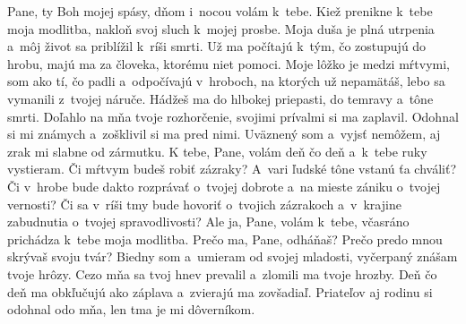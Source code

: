 Pane, ty Boh mojej spásy,
dňom i~nocou volám k~tebe.
\versseparator
Kiež prenikne k~tebe moja modlitba,
nakloň svoj sluch k~mojej prosbe.
\versseparator
Moja duša je plná utrpenia
a~môj život sa priblížil k~ríši smrti.
\versseparator
Už ma počítajú k~tým, čo zostupujú do hrobu,
majú ma za človeka, ktorému niet pomoci.
\versseparator
Moje lôžko je medzi mŕtvymi,
som ako tí, čo padli a~odpočívajú v~hroboch,
\versseparator
na ktorých už nepamätáš,
lebo sa vymanili z~tvojej náruče.
\versseparator
Hádžeš ma do hlbokej priepasti,
do temravy a~tône smrti.
\versseparator
Doľahlo na mňa tvoje rozhorčenie,
svojimi prívalmi si ma zaplavil.
\versseparator
Odohnal si mi známych
a~zošklivil si ma pred nimi.
\versseparator
Uväznený som a~vyjsť nemôžem,
aj zrak mi slabne od zármutku.
\versseparator
K tebe, Pane, volám deň čo deň
a~k~tebe ruky vystieram.
\versseparator
Či mŕtvym budeš robiť zázraky?
A~vari ľudské tône vstanú ťa chváliť?
\versseparator
Či v~hrobe bude dakto rozprávať o~tvojej dobrote
a~na mieste zániku o~tvojej vernosti?
\versseparator
Či sa v~ríši tmy bude hovoriť o~tvojich zázrakoch
a~v~krajine zabudnutia o~tvojej spravodlivosti?
\versseparator
Ale ja, Pane, volám k~tebe,
včasráno prichádza k~tebe moja modlitba.
\versseparator
Prečo ma, Pane, odháňaš?
Prečo predo mnou skrývaš svoju tvár?
\versseparator
Biedny som a~umieram od svojej mladosti,
vyčerpaný znášam tvoje hrôzy.
\versseparator
Cezo mňa sa tvoj hnev prevalil
a~zlomili ma tvoje hrozby.
\versseparator
Deň čo deň ma obkľučujú ako záplava
a~zvierajú ma zovšadiaľ.
\versseparator
Priateľov aj rodinu si odohnal odo mňa,
len tma je mi dôverníkom.
